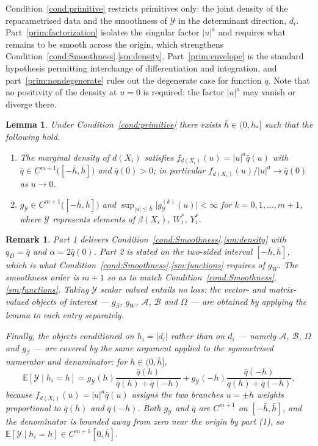 \documentclass{article}
\newtheorem{remark}{Remark}
\newtheorem{lemma}{Lemma}
\newcommand{\E}{\mathbb{E}}
\begin{document}
\noindent
Condition~\ref{cond:primitive} restricts primitives only: the joint density of the reparametrised
data and the smoothness of $\mathcal{Y}$ in the determinant direction, $d_i$. Part~\ref{prim:factorization}
isolates the singular factor $|u|^{a}$ and requires what remains to be smooth across the origin,
which strengthens Condition~\ref{cond:Smoothness}.\ref{sm:density}. Part~\ref{prim:envelope} is the standard
 hypothesis permitting interchange of differentiation and integration, and
part~\ref{prim:nondegenerate} rules out the degenerate case for function $q$. Note that no positivity of the density at $u=0$ is required: the factor $|u|^{a}$ may
vanish or diverge there.

\begin{lemma}\label{lemma:primitive_conditions}
Under Condition~\ref{cond:primitive} there exists $\bar h\in(0,h_{*}]$ such that
the following hold.
\begin{enumerate}
    \item The marginal density of $d(X_i)$ satisfies
    $f_{d(X_i)}(u)=|u|^{a}\bar q(u)$ with
    $\bar q\in C^{m+1}\bigl([-\bar h,\bar h]\bigr)$ and $\bar q(0)>0$; in
    particular $f_{d(X_i)}(u)/|u|^{a}\to \bar q(0)$ as $u\to 0$.
    \item $g_{\mathcal{Y}}\in C^{m+1}\bigl([-\bar h,\bar h]\bigr)$ and
    $\displaystyle\sup_{|u|\le \bar h}\bigl|g_{\mathcal{Y}}^{(k)}(u)\bigr|<\infty$
    for $k=0,1,\dots,m+1$, where $\mathcal{Y}$ represents elements of $\beta(X_i)$, $W_i^{*}$, $Y_i^{*}$.
\end{enumerate}
\end{lemma}

\begin{remark}
Part 1 delivers Condition~\ref{cond:Smoothness}.\ref{sm:density} with $q_D=\bar q$ and
$\alpha=2\bar q(0)$. Part 2 is stated on the \emph{two-sided} interval
$[-\bar h,\bar h]$, which is what Condition~\ref{cond:Smoothness}.\ref{sm:functions} requires of
$g_W$. The smoothness order is $m+1$
so as to match Condition~\ref{cond:Smoothness}.\ref{sm:functions}.
Taking $\mathcal{Y}$ scalar valued entails no loss: the vector- and
matrix-valued objects of interest --- $g_\beta$, $g_W$, $\mathcal{A}$,
$\mathcal{B}$ and $\Omega$ --- are obtained by applying the lemma to each entry
separately.

Finally, the objects conditioned on $h_i=|d_i|$ rather than on $d_i$ --- namely
$\mathcal{A}$, $\mathcal{B}$, $\Omega$ and $g_\beta$ --- are covered by the same
argument applied to the symmetrised numerator and denominator: for
$h\in(0,\bar h]$,
\[
    \E\!\left[\mathcal{Y}\mid h_i=h\right]
    = g_{\mathcal{Y}}(h)\frac{\bar q(h)}{\bar q(h)+\bar q(-h)} + g_{\mathcal{Y}}(-h)\frac{\bar q(-h)}{\bar q(h)+\bar q(-h)},
\]
because $f_{d(X_i)}(u)=|u|^{a}\bar q(u)$ assigns the two branches $u=\pm h$
weights proportional to $\bar q(h)$ and $\bar q(-h)$. Both $g_{\mathcal{Y}}$ and $\bar q$ are
$C^{m+1}$ on $[-\bar h,\bar h]$, and the denominator is bounded away from zero near the origin by
part (1), so $\E\!\left[\mathcal{Y}\mid h_i=h\right]\in C^{m+1}[0,\bar h]$.
\end{remark}
\end{document}
